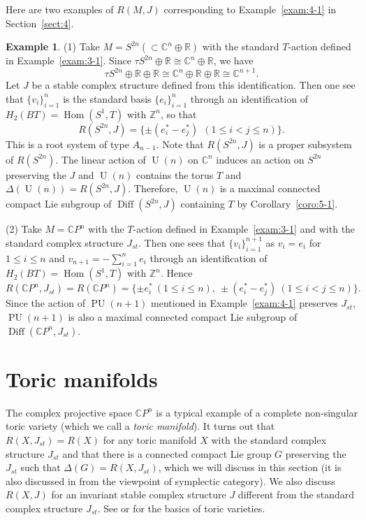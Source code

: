 \documentclass[12pt]{amsart}
\theoremstyle{plain} \numberwithin{equation}{section}
\theoremstyle{definition}
\newtheorem{exam}[theo]{Example}
\def\Z{\mathbb Z}
\def\C{\mathbb C}
\def\R{\mathbb R}
\def\RG{\Delta(G)}
\DeclareMathOperator{\Diff}{Diff}
\DeclareMathOperator{\U}{U}
\DeclareMathOperator{\PU}{PU}
\DeclareMathOperator{\Hom}{Hom}
\def\Jst{J_{st}}
\begin{document}
Here are two examples of $R(M,J)$ corresponding to Example~\ref{exam:4-1} in Section~\ref{sect:4}.   

\begin{exam} \label{exam:5-1}
(1) Take $M=S^{2n} (\subset \C^n\oplus\R)$ with the standard $T$-action defined in Example~\ref{exam:3-1}.  Since $\tau S^{2n}\oplus\R\cong \C^n\oplus\R$, we have 
\[
\tau S^{2n}\oplus\R\oplus\R\cong \C^n\oplus\R\oplus\R\cong \C^{n+1}.
\] 
Let $J$ be a stable complex structure defined from this identification.  Then one see that $\{v_i\}_{i=1}^n$ is the standard basis $\{e_i\}_{i=1}^n$ through an identification of $H_2(BT)=\Hom(S^1,T)$ with $\Z^n$, so that 
\[
R(S^{2n},J)=\{\pm(e_i^*-e_j^*)\ \ (1\le i<j\le n)\}.
\]  
This is a root system of type $A_{n-1}$.  Note that $R(S^{2n},J)$ is a proper subsystem of $R(S^{2n})$.  The linear action of $\U(n)$ on $\C^n$ induces an action on $S^{2n}$ preserving the $J$ and $\U(n)$ contains the torus $T$ and $\Delta(\U(n))=R(S^{2n},J)$.  Therefore, $\U(n)$ is a maximal connected compact Lie subgroup of $\Diff(S^{2n},J)$ containing $T$ by Corollary~\ref{coro:5-1}.  

(2) Take $M=\C P^n$ with the $T$-action defined in Example~\ref{exam:3-1} and with the standard complex structure $\Jst$.  Then one sees that 
$\{v_i\}_{i=1}^{n+1}$ as $v_i=e_i$ for $1\le i\le n$ and $v_{n+1}=-\sum_{i=1}^ne_i$ through an identification of $H_2(BT)=\Hom(S^1,T)$ with $\Z^n$. Hence 
\[
R(\C P^n,\Jst)=R(\C P^n)=\{\pm e_i^*\ (1\le i\le n),\ \pm(e_i^*-e_j^*) \ (1\le i<j\le n)\}.
\]
Since the action of $\PU(n+1)$ mentioned in Example~\ref{exam:4-1} preserves $\Jst$, $\PU(n+1)$ is also a maximal connected compact Lie subgroup of $\Diff(\C P^n,\Jst)$. 
\end{exam}


\section{Toric manifolds} \label{sect:6}

The complex projective space $\C P^n$ is a typical example of a complete non-singular toric variety (which we call a \emph{toric manifold}).  It turns out that $R(X,\Jst)=R(X)$ for any toric manifold $X$ with the standard complex structure $\Jst$ and that there is a connected compact Lie group $G$ preserving the $\Jst$ such that $\RG=R(X,\Jst)$, which we will discuss in this section (it is also discussed in \cite{masu10} from the viewpoint of symplectic category).  We also discuss $R(X,J)$ for an invariant stable complex structure $J$ different from the standard complex structure $\Jst$.  See \cite{fult93} or \cite{oda88} for the basics of toric varieties. 
\end{document}
